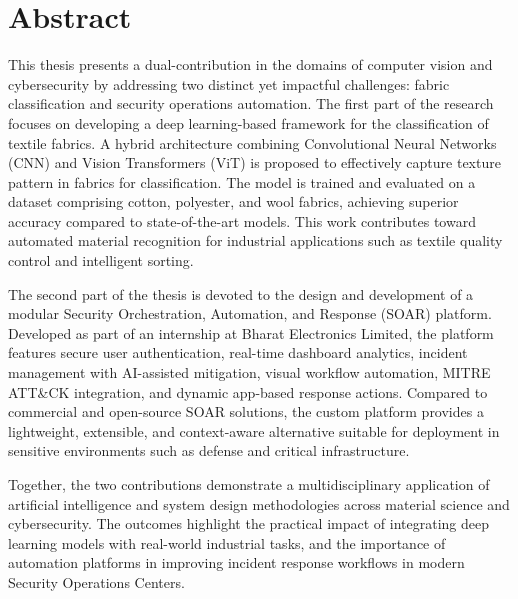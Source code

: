 \chapter*{Abstract}

This thesis presents a dual-contribution in the domains of computer vision and cybersecurity by addressing two distinct yet impactful challenges: fabric classification and security operations automation. The first part of the research focuses on developing a deep learning-based framework for the classification of textile fabrics. A hybrid architecture combining Convolutional Neural Networks (CNN) and Vision Transformers (ViT) is proposed to effectively capture texture pattern in fabrics for classification. The model is trained and evaluated on a dataset comprising cotton, polyester, and wool fabrics, achieving superior accuracy compared to state-of-the-art models. This work contributes toward automated material recognition for industrial applications such as textile quality control and intelligent sorting.

The second part of the thesis is devoted to the design and development of a modular Security Orchestration, Automation, and Response (SOAR) platform. Developed as part of an internship at Bharat Electronics Limited, the platform features secure user authentication, real-time dashboard analytics, incident management with AI-assisted mitigation, visual workflow automation, MITRE ATT\&CK integration, and dynamic app-based response actions. Compared to commercial and open-source SOAR solutions, the custom platform provides a lightweight, extensible, and context-aware alternative suitable for deployment in sensitive environments such as defense and critical infrastructure.

Together, the two contributions demonstrate a multidisciplinary application of artificial intelligence and system design methodologies across material science and cybersecurity. The outcomes highlight the practical impact of integrating deep learning models with real-world industrial tasks, and the importance of automation platforms in improving incident response workflows in modern Security Operations Centers.
